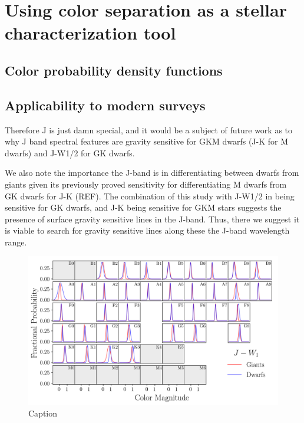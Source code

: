 \chapter{Using color separation as a stellar characterization tool}\label{chap:color_as_tool}

\section{Color probability density functions}

\section{Applicability to modern surveys}
Therefore J is just damn special, and it would be a subject of future work as to why J band spectral features are gravity sensitive for GKM dwarfs (J-K for M dwarfs) and J-W1/2 for GK dwarfs.

We also note the importance the J-band is in differentiating between dwarfs from giants given its previously proved sensitivity for differentiating M dwarfs from GK dwarfs for J-K (REF). The combination of this study with J-W1/2 in being sensitive for GK dwarfs, and J-K being sensitive for GKM stars suggests the presence of surface gravity sensitive lines in the J-band. Thus, there we suggest it is viable to search for gravity sensitive lines along these the J-band wavelength range.


\begin{figure}
    \centering
    \includegraphics[width=1.0\textwidth,clip=true]{Figures/periodic/periodic-t-pdf_J_W1.png}
    \caption{Caption}
    \label{fig:periodic-pdf-jw1}
\end{figure}

